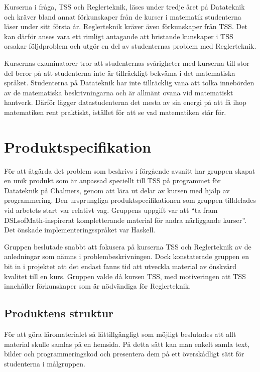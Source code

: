 \documentclass[12pt,a4paper,twoside,openright]{article}
\begin{document}
Kurserna i fråga, TSS och Reglerteknik, läses under tredje året på
Datateknik och kräver bland annat förkunskaper från de kurser i
matematik studenterna läser under sitt första år. Reglerteknik kräver
även förkunskaper från TSS. Det kan därför anses vara ett rimligt
antagande att bristande kunskaper i TSS orsakar följdproblem och utgör
en del av studenternas problem med Reglerteknik.

Kursernas examinatorer tror att studenternas svårigheter med kurserna
till stor del beror på att studenterna inte är tillräckligt bekväma i
det matematiska språket. Studenterna på Datateknik har inte
tillräcklig vana att tolka innebörden av de matematiska
beskrivningarna och är allmänt ovana vid matematiskt hantverk. Därför
lägger datastudenterna det mesta av sin energi på att få ihop
matematiken rent praktiskt, istället för att se vad matematiken står
för.

\section{Produktspecifikation}

För att åtgärda det problem som beskrivs i förgående avsnitt har
gruppen skapat en unik produkt som är anpassad speciellt till TSS på
programmet för Datateknik på Chalmers, genom att lära ut delar av kursen 
med  hjälp av programmering. Den ursprungliga produktspecifikationen som 
gruppen tilldelades vid arbetets start var relativt vag. Gruppens uppgift 
var att ``ta fram DSLsofMath-inspirerat kompletterande material för andra 
närliggande kurser''. Det önskade implementeringsspråket var Haskell.

Gruppen beslutade snabbt att fokusera på kurserna TSS och Reglerteknik
av de anledningar som nämns i problembeskrivningen. Dock konstaterade
gruppen en bit in i projektet att det endast fanns tid att utveckla
material av önskvärd kvalitet till en kurs. Gruppen valde då kursen
TSS, med motiveringen att TSS innehåller förkunskaper som är
nödvändiga för Reglerteknik.

\subsection{Produktens struktur}
\label{sec:prodSpec}
För att göra läromaterialet så lättillgängligt som möjligt beslutades att
allt material skulle samlas på en hemsida. På detta sätt kan man enkelt
samla text, bilder och programmeringskod och presentera dem på ett
överskådligt sätt för studenterna i målgruppen.
\end{document}
